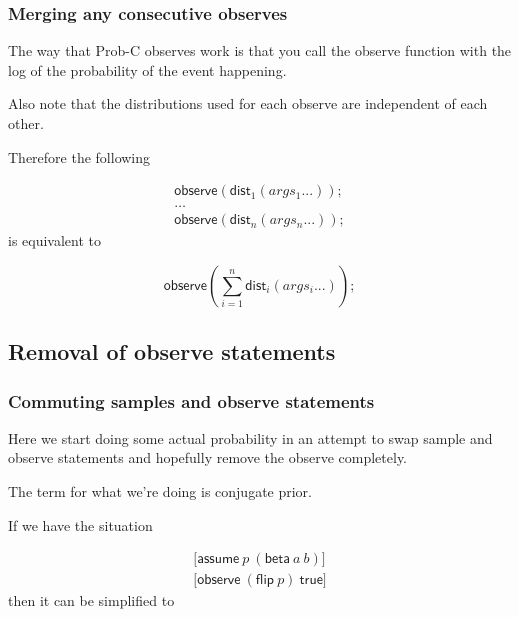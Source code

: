 \documentclass[a4paper]{article}
\begin{document}
\subsubsection{Merging any consecutive observes}

The way that Prob-C observes work is that you call the observe function with the log of the probability of the event happening.

Also note that the distributions used for each observe are independent of each other.

Therefore the following

\[
	\begin{array}{l}
		\mathsf{observe}(\mathsf{dist}_1(args_1 ...)); \\
		\dots \\
		\mathsf{observe}(\mathsf{dist}_n(args_n ...));
	\end{array}
\]
is equivalent to

\[\mathsf{observe}(\sum_{i=1}^n\mathsf{dist}_i(args_i ...));\]




\subsection{Removal of observe statements}




\subsubsection{Commuting samples and observe statements}

Here we start doing some actual probability in an attempt to swap sample and observe statements and hopefully remove the observe completely.

The term for what we're doing is conjugate prior.

If we have the situation

\[
	\begin{array}{l}
		\lbrack \mathsf{assume}\ p\ (\mathsf{beta}\ a\ b) \rbrack \\
		\lbrack \mathsf{observe}\ (\mathsf{flip}\ p)\ \mathsf{true} \rbrack
	\end{array}
\]
then it can be simplified to
\end{document}
